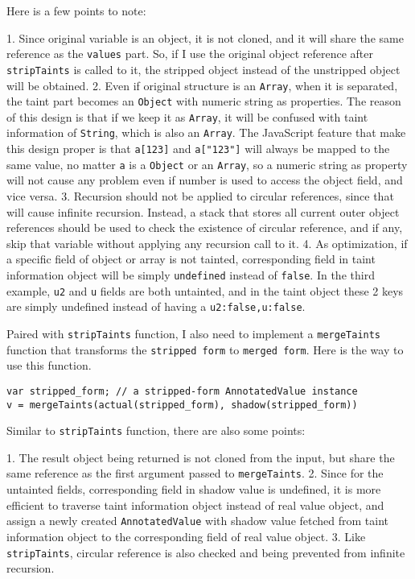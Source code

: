 Here is a few points to note: 

1. Since original variable is an object, it is not cloned, and it will share the same reference as the \texttt{values} part. So, if I use the original object reference after \texttt{stripTaints} is called to it, the stripped object instead of the unstripped object will be obtained. 
2. Even if original structure is an \texttt{Array}, when it is separated, the taint part becomes an \texttt{Object} with numeric string as properties. The reason of this design is that if we keep it as \texttt{Array}, it will be confused with taint information of \texttt{String}, which is also an \texttt{Array}. The JavaScript feature that make this design proper is that \texttt{a[123]} and \texttt{a["123"]} will always be mapped to the same value, no matter \texttt{a} is a \texttt{Object} or an \texttt{Array}, so a numeric string as property will not cause any problem even if number is used to access the object field, and vice versa. 
3. Recursion should not be applied to circular references, since that will cause infinite recursion. Instead, a stack that stores all current outer object references should be used to check the existence of circular reference, and if any, skip that variable without applying any recursion call to it.
4. As optimization, if a specific field of object or array is not tainted, corresponding field in taint information object will be simply \texttt{undefined} instead of \texttt{false}. In the third example, \texttt{u2} and \texttt{u} fields are both untainted, and in the taint object these 2 keys are simply undefined instead of having a \texttt{u2:false,u:false}.

Paired with \texttt{stripTaints} function, I also need to implement a \texttt{mergeTaints} function that transforms the \texttt{stripped form} to \texttt{merged form}. Here is the way to use this function.

\begin{verbatim}
var stripped_form; // a stripped-form AnnotatedValue instance
v = mergeTaints(actual(stripped_form), shadow(stripped_form))
\end{verbatim}

Similar to \texttt{stripTaints} function, there are also some points:

1. The result object being returned is not cloned from the input, but share the same reference as the first argument passed to \texttt{mergeTaints}.
2. Since for the untainted fields, corresponding field in shadow value is undefined, it is more efficient to traverse taint information object instead of real value object, and assign a newly created \texttt{AnnotatedValue} with shadow value fetched from taint information object to the corresponding field of real value object. 
3. Like \texttt{stripTaints}, circular reference is also checked and being prevented from infinite recursion.

